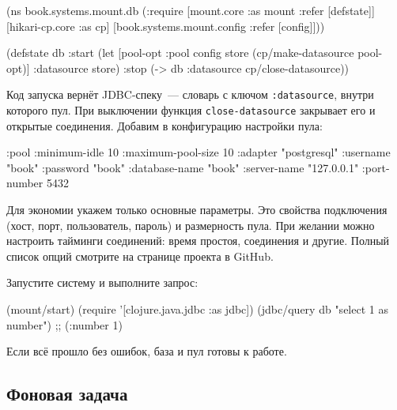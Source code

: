 \else

\begin{english}
  \begin{clojure}
(ns book.systems.mount.db
  (:require
   [mount.core :as mount :refer [defstate]]
   [hikari-cp.core :as cp]
   [book.systems.mount.config :refer [config]]))

(defstate db
  :start
  (let [{pool-opt :pool} config
        store (cp/make-datasource pool-opt)]
    {:datasource store})
  :stop
  (-> db :datasource cp/close-datasource))
  \end{clojure}
\end{english}

\fi


Код запуска вернёт JDBC-спеку~--- словарь с ключом \texttt{:data\-sour\-ce},
внутри которого пул. При выключении функция \texttt{close\--datasource} закрывает
его и открытые соединения. Добавим в конфигурацию настройки пула:

\begin{english}
  \begin{clojure}
{:pool {:minimum-idle       10
        :maximum-pool-size  10
        :adapter            "postgresql"
        :username           "book"
        :password           "book"
        :database-name      "book"
        :server-name        "127.0.0.1"
        :port-number        5432}}
  \end{clojure}
\end{english}

Для экономии укажем только основные параметры. Это свойства подключения (хост,
порт, пользователь, пароль) и размерность пула. При желании можно настроить
тайминги соединений: время простоя, соединения и другие. Полный список опций
смотрите на странице проекта в GitHub.

Запустите систему и выполните запрос:

\begin{english}
  \begin{clojure}
(mount/start)
(require '[clojure.java.jdbc :as jdbc])
(jdbc/query db "select 1 as number")
;; ({:number 1})
  \end{clojure}
\end{english}

Если всё прошло без ошибок, база и пул готовы к работе.

\subsection{Фоновая задача}

